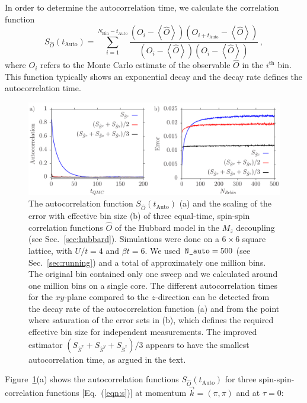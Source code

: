 In order to determine the autocorrelation time, we calculate the correlation function
\begin{equation}
\label{eqn:autocorrel}
	S_{\hat{O}}(t_{\textrm{Auto}})=\sum_{i=1}^{N_{\textrm{Bin}}-t_{\textrm{Auto}}}\frac{\left(O_i-\left\langle \hat{O}\right\rangle \right)\left(O_{i+t_{\textrm{Auto}}}-\left\langle \hat{O}\right\rangle \right)}{\left(O_i-\left\langle \hat{O}\right\rangle \right)\left(O_{i}-\left\langle \hat{O}\right\rangle \right)}\, ,
\end{equation}
where $O_i$ refers to the Monte Carlo estimate of the observable $\hat{O}$ in the $i^{\text{th}}$ bin. This function typically shows an exponential decay and the decay rate defines the autocorrelation time.
%
\begin{figure}
	\begin{center}
		\includegraphics[width=.95\textwidth]{Figures/fig1.pdf}
		\caption{The autocorrelation function $S_{\hat{O}}(t_{\textrm{Auto}})$ (a) and the scaling of the error with effective bin size (b) of three equal-time, spin-spin correlation functions $\hat{O}$ of the Hubbard model in the $M_z$ decoupling (see Sec.~\ref{sec:hubbard}). Simulations were done on a $ 6 \times 6$ square lattice, with  $U/t=4$ and $\beta t = 6$. We used $\textrm{\texttt{N\_auto}}=500$ (see Sec.~\ref{sec:running}) and a total of approximately one million bins. The original bin contained only one sweep and we calculated around one million bins on a single core. The different  autocorrelation times for the $xy$-plane compared to the $z$-direction can be detected from the decay rate of the autocorrelation function (a) and from the point where saturation of the error sets in (b), which defines the required effective bin size for independent measurements. The improved estimator $(S_{\hat{S}^{x}} + S_{\hat{S}^{y}}+ S_{\hat{S}^{z}})/3$ appears to have the smallest autocorrelation time, as argued in the text.}
		\label{fig_autocorr}
	\end{center}
\end{figure}
%
Figure~\ref{fig_autocorr}(a) shows the autocorrelation functions $S_{\hat{O}}(t_{\textrm{Auto}})$ for three spin-spin-correlation functions [Eq.~(\ref{eqn:s})] at momentum $\vec{k}=(\pi,\pi)$ and at $\tau=0$: 


